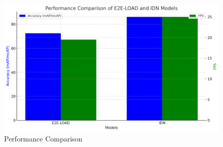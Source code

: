 \vspace{12pt}
\vspace{12pt}
\vspace{12pt}

\begin{figure}[htbp]
    \centering
    \includegraphics[width=6in]{img/performance.png}
    \caption{Performance Comparison}
    \label{fig:example}
\end{figure}
